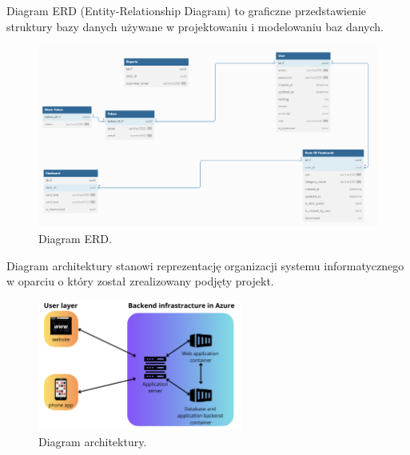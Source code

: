 \begin{minipage}{\textwidth}
\setlength{\parindent}{15pt}

\indent Diagram ERD (Entity-Relationship Diagram) to graficzne przedstawienie struktury bazy danych używane w projektowaniu i modelowaniu baz danych.



\begin{figure}[H]
    \centering
    \includegraphics[width=1\textwidth]{chapters/chapter_6/erd}
    \caption{Diagram ERD.}
    \label{img:erd}
\end{figure}


\indent Diagram architektury stanowi reprezentację organizacji systemu informatycznego w oparciu o który został zrealizowany podjęty projekt.


\begin{figure}[H]
    \centering
    \includegraphics[width=0.6\textwidth]{chapters/chapter_6/diagram_architektury}
    \caption{Diagram architektury.}
    \label{img:diagram_architektury}
\end{figure}

\end{minipage}

